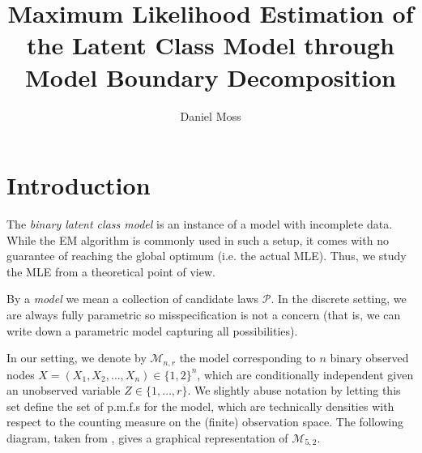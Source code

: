 \documentclass{article}
\title{Maximum Likelihood Estimation of the Latent Class Model through Model Boundary Decomposition}
\author{Daniel Moss}
\theoremstyle{plain}
\theoremstyle{definition}
\theoremstyle{plain} %
\newcommand{\M}{{\mathcal M}}
\begin{document}
\maketitle

\section{Introduction}
The \textit{binary latent class model} is an instance of a model with incomplete data. While the EM algorithm is commonly used in such a setup, it comes with no guarantee of reaching the global optimum (i.e. the actual MLE). Thus, we study the MLE from a theoretical point of view.

\vspace{1ex}
By a \textit{model} we mean a collection of candidate laws $\mathcal{P}$. In the discrete setting, we are always fully parametric so misspecification is not a concern (that is, we can write down a parametric model capturing all possibilities).

\vspace{2ex}
In our setting, we denote by $\mathcal{M}_{n,r}$ the model corresponding to $n$ binary observed nodes $X=(X_1,X_2,\dots,X_n)\in\{1,2\}^n$, which are conditionally independent given an unobserved variable $Z\in\{1,\dots,r\}$. We slightly abuse notation by letting this set define the set of p.m.f.s for the model, which are technically densities with respect to the counting measure on the (finite) observation space. The following diagram, taken from \cite{allman2017maximum}, gives a graphical representation of $\M_{5,2}$.
\end{document}
